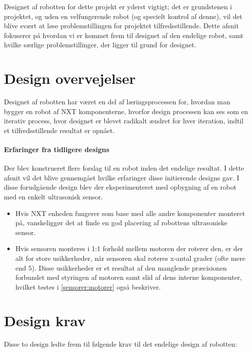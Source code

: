 Designet af robotten for dette projekt er yderst vigtigt; det er grundstenen i projektet, og uden en velfungerende robot (og specielt kontrol af denne), vil det blive svært at løse problemstillingen for projektet tilfredsstillende.
Dette afsnit fokuserer på hvordan vi er kommet frem til designet af den endelige robot, samt hvilke særlige problemstillinger, der ligger til grund for designet.

\section{Design overvejelser}\label{robot:design}
Designet af robotten har været en del af læringsprocessen for, hvordan man bygger en robot af \lego NXT komponenterne, hvorfor design processen kan ses som en iterativ process, hvor designet er blevet radikalt ændret for hver iteration, indtil et tilfredsstillende resultat er opnået.


\paragraph{Erfaringer fra tidligere designs} 
Der blev konstrueret flere forslag til en robot inden det endelige resultat. 
I dette afsnit vil det blive gennemgået hvilke erfaringer disse initierende designs gav.
I disse forudgående design blev der eksperimenteret med opbygning af en robot med en enkelt ultrasonisk sensor.

\begin{itemize}
\item Hvis NXT enheden fungerer som base med alle andre komponenter monteret på, vanskeliggør det at finde en god placering af robottens ultrasoniske sensor.

\item Hvis sensoren monteres i 1:1 forhold mellem motoren der roterer den, er der alt for store usikkerheder, når sensoren skal roteres x-antal grader (ofte mere end 5\degree).
Disse usikkerheder er et resultat af den manglende præcisionen forbundet med styringen af motoren samt slid af dens interne komponenter, hvilket testes i \cref{sensorer:motorer} også beskriver.
\end{itemize}

\section{Design krav}
Disse to design ledte frem til følgende krav til det endelige design af robotten:

